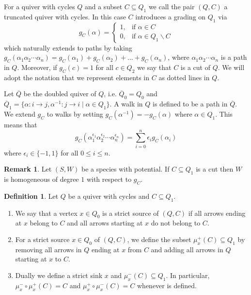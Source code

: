 \documentclass[a4paper, reqno]{amsart}
\theoremstyle{definition}
\newtheorem{mydef}[mythm]{Definition}
\newtheorem{myrem}[mythm]{Remark}
\begin{document}
For a quiver with cycles $Q$ and a subset $C\subseteq Q_1$ we call the pair $(Q, C)$ a truncated quiver with cycles. In this case $C$ introduces a grading on $Q_1$ via
\begin{equation*}
	g_C(\alpha) = \begin{cases}
		1, & \text{if }\alpha\in C \\
		0, & \text{if }\alpha\in Q_1\backslash C
	\end{cases}
\end{equation*}
which naturally extends to paths by taking $g_C(\alpha_1 \alpha_2 \cdots \alpha_n) = g_C(\alpha_1) + g_C(\alpha_2) + \dots + g_C(\alpha_n)$, where $\alpha_1\alpha_2\cdots \alpha_n$ is a path in $Q$. Moreover, if $g_C(c) = 1$ for all $c\in Q_2$ we say that $C$ is a cut of $Q$. We will adopt the notation that we represent elements in $C$ as dotted lines in $Q$.

Let $\overline{Q}$ be the doubled quiver of $Q$, i.e. $\overline{Q}_0 = Q_0$ and $\overline{Q}_1 = \{\alpha: i\to j, \alpha^{-1}:j\to i \mid \alpha\in Q_1 \}$. A walk in $Q$ is defined to be a path in $\overline{Q}$. We extend $g_C$ to walks by setting $g_C(\alpha^{-1}) = -g_C(\alpha)$ where $\alpha\in Q_1$. This means that
\begin{equation*}
	g_C(\alpha_1^{\epsilon_1}\alpha_2^{\epsilon_2}\cdots \alpha_n^{\epsilon_n}) = \sum_{i=0}^n \epsilon_i g_C(\alpha_i)
\end{equation*}
where $\epsilon_i \in \{-1, 1\}$ for all $0\le i\le n$.

\begin{myrem}
	Let $(S, W)$ be a species with potential. If $C\subseteq Q_1$ is a cut then $W$ is homogeneous of degree $1$ with respect to $g_C$.
\end{myrem}

\begin{mydef}\label{definition - cut-mutation}\cite[Definition 6.10]{HerschendOsamu2011quiverwithpotential}
	Let $Q$ be a quiver with cycles and $C\subseteq Q_1$.
	\begin{enumerate}[label=(a)]
		\item We say that a vertex $x\in Q_0$ is a strict source of $(Q, C)$ if all arrows ending at $x$ belong to $C$ and all arrows starting at $x$ do not belong to $C$.
		\item For a strict source $x\in Q_0$ of $(Q, C)$, we define the subset $\mu_x^+(C)\subseteq Q_1$ by removing all arrows in $Q$ ending at $x$ from $C$ and adding all arrows in $Q$ starting at $x$ to $C$.
		\item Dually we define a strict sink $x$ and $\mu_x^-(C)\subseteq Q_1$. In particular, $\mu_x^-\circ \mu_x^+(C) = C$ and $\mu_x^+\circ \mu_x^-(C) = C$ whenever is defined.
	\end{enumerate}
\end{mydef}
\end{document}
